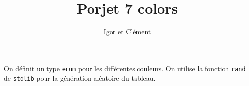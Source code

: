 \documentclass[12pt,L,fira-sans]{paper}
\title{Porjet 7 colors}
\author{Igor \maj{Martayan} et Clément \maj{Morrand}}
\begin{document}
\maketitle

\begin{qu}
	On définit un type \verb|enum| pour les différentes couleurs.
	On utilise la fonction \verb|rand| de \verb|stdlib| pour la génération aléatoire du tableau.
\end{qu}
\end{document}
